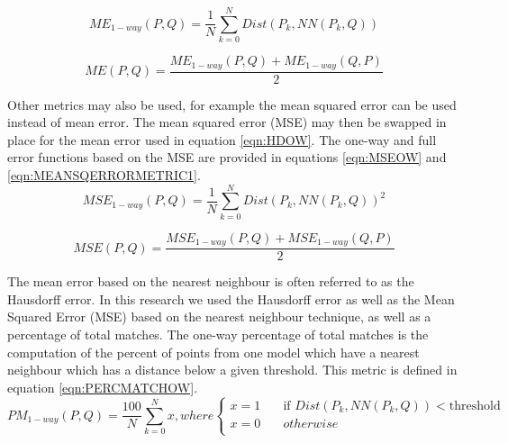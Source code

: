 \begin{equation} \label{eqn:HDOW}
ME_{1-way}(P, Q) = \frac{1}{N}\sum_{k=0}^{N} Dist(P_k, NN(P_k, Q))
\end{equation}


\begin{equation} \label{eqn:MEANERRORMETRIC1}
ME(P, Q) = \frac{ME_{1-way}(P,Q) + ME_{1-way}(Q,P)}{2}
\end{equation}

Other metrics may also be used, for example the mean squared error can be used instead of mean error. The mean squared error (MSE) may then be swapped in place for the mean error used in equation \ref{eqn:HDOW}. The one-way and full error functions based on the MSE are provided in equations \ref{eqn:MSEOW} and \ref{eqn:MEANSQERRORMETRIC1}. \\


\begin{equation} \label{eqn:MSEOW}
MSE_{1-way}(P, Q) = \frac{1}{N}\sum_{k=0}^{N} Dist(P_k, NN(P_k, Q))^2
\end{equation}


\begin{equation} \label{eqn:MEANSQERRORMETRIC1}
MSE(P,Q) = \frac{MSE_{1-way}(P,Q) + MSE_{1-way}(Q,P)}{2}
\end{equation}


The mean error based on the nearest neighbour is often referred to as the Hausdorff error. In this research we used the Hausdorff error as well as the Mean Squared Error (MSE) based on the nearest neighbour technique, as well as a percentage of total matches. The one-way percentage of total matches is the computation of the percent of points from one model which have a nearest neighbour which has a distance below a given threshold. This metric is defined in equation \ref{eqn:PERCMATCHOW}. \\

\begin{equation} \label{eqn:PERCMATCHOW}
PM_{1-way}(P, Q) = \frac{100}{N}\sum_{k=0}^{N} x, where
  \begin{cases}
    x=1       & \quad \text{if } Dist(P_k,NN(P_k,Q)) < \text{threshold}\\
    x=0  & \quad otherwise\\
  \end{cases}
\end{equation}

